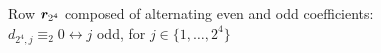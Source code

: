 
\begin{figure}[htb]

    \noindent{}

    \captionsetup{singlelinecheck=off}
    \caption[Row $\vect{r}_{2^{4}}$ of $\mathcal{C}_{\equiv_{2}}$]
        {Row $\vect{r}_{2^{4}}$ composed of alternating even and odd coefficients:
            $d_{2^{4},j}\equiv_{2}0 \leftrightarrow j$ odd,
                for $j\in\lbrace1,\ldots,2^{4} \rbrace$ }

    \label{fig:catalan-alternating-row}

\end{figure}

